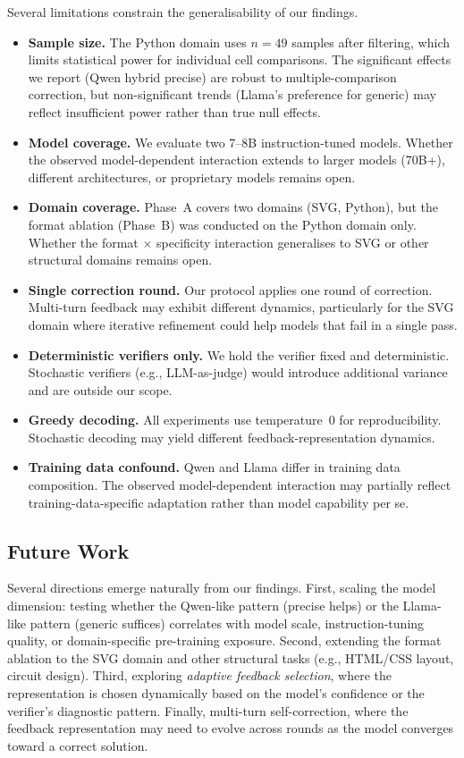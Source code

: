 Several limitations constrain the generalisability of our findings.

\begin{itemize}
    \item \textbf{Sample size.} The Python domain uses $n = 49$ samples after filtering, which limits statistical power for individual cell comparisons. The significant effects we report (Qwen hybrid precise) are robust to multiple-comparison correction, but non-significant trends (Llama's preference for generic) may reflect insufficient power rather than true null effects.
    \item \textbf{Model coverage.} We evaluate two 7--8B instruction-tuned models. Whether the observed model-dependent interaction extends to larger models (70B+), different architectures, or proprietary models remains open.
    \item \textbf{Domain coverage.} Phase~A covers two domains (SVG, Python), but the format ablation (Phase~B) was conducted on the Python domain only. Whether the format $\times$ specificity interaction generalises to SVG or other structural domains remains open.
    \item \textbf{Single correction round.} Our protocol applies one round of correction. Multi-turn feedback may exhibit different dynamics, particularly for the SVG domain where iterative refinement could help models that fail in a single pass.
    \item \textbf{Deterministic verifiers only.} We hold the verifier fixed and deterministic. Stochastic verifiers (e.g., LLM-as-judge) would introduce additional variance and are outside our scope.
    \item \textbf{Greedy decoding.} All experiments use temperature~0 for reproducibility. Stochastic decoding may yield different feedback-representation dynamics.
    \item \textbf{Training data confound.} Qwen and Llama differ in training data composition. The observed model-dependent interaction may partially reflect training-data-specific adaptation rather than model capability per se.
\end{itemize}

\subsection{Future Work}

Several directions emerge naturally from our findings. First, scaling the model dimension: testing whether the Qwen-like pattern (precise helps) or the Llama-like pattern (generic suffices) correlates with model scale, instruction-tuning quality, or domain-specific pre-training exposure. Second, extending the format ablation to the SVG domain and other structural tasks (e.g., HTML/CSS layout, circuit design). Third, exploring \emph{adaptive feedback selection}, where the representation is chosen dynamically based on the model's confidence or the verifier's diagnostic pattern. Finally, multi-turn self-correction, where the feedback representation may need to evolve across rounds as the model converges toward a correct solution.
